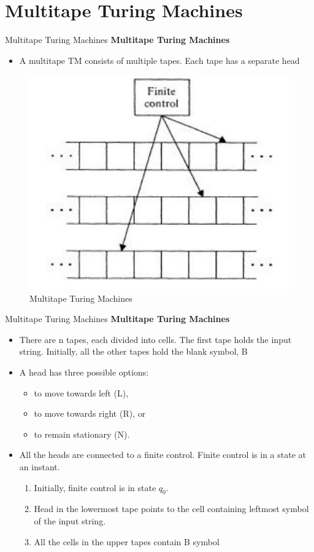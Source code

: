 \documentclass{beamer}
\begin{document}
\section{Multitape Turing Machines}
\begin{frame}{ Multitape Turing Machines}
	\textbf{ Multitape Turing Machines}
	\begin{itemize}
		\item A multitape TM consists of multiple tapes. Each tape has a separate head
	\end{itemize}
\begin{figure}
	\includegraphics[scale=.4]{img5/m14}
	\caption{Multitape Turing Machines}
\end{figure}
\end{frame}
\begin{frame}{ Multitape Turing Machines}
	\textbf{ Multitape Turing Machines}
	\begin{itemize}
		\item There are n tapes, each divided into cells. The first tape holds the input string. Initially, all the other tapes hold the blank
		symbol, B
		\item A head has three possible options:
		\begin{itemize}
			\item to move towards left (L),
			\item to move towards right (R), or
			\item to remain stationary (N).
		\end{itemize}
	\item All the heads are connected to a finite control. Finite control is in a state at an instant.
	\begin{enumerate}
		\item Initially, finite control is in state $q_0$.
		\item Head in the lowermost tape points to the cell containing leftmost symbol of the input string.
		\item All the cells in the upper tapes contain B symbol
	\end{enumerate}
	\end{itemize}
\end{frame}
\end{document}
